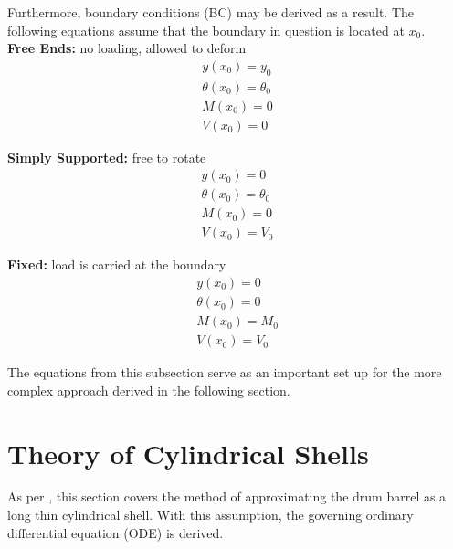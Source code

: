 Furthermore, boundary conditions (BC) may be derived as a result. The following equations assume that the boundary in question is located at $x_0$.\\

\textbf{Free Ends:} no loading, allowed to deform\\
\begin{equation}
	\label{eq:2_freeBC}
	\begin{aligned}
		y(x_0) = y_0          \\
		\theta(x_0)= \theta_0 \\
		M(x_0) = 0            \\
		V(x_0) = 0            
	\end{aligned}
\end{equation}

\textbf{Simply Supported:} free to rotate\\
\begin{equation}
	\label{eq:2_endBC}
	\begin{aligned}
		y(x_0)= 0            \\
		\theta(x_0)=\theta_0 \\
		M(x_0)= 0            \\
		V(x_0) =V_0          
	\end{aligned}
\end{equation}

\textbf{Fixed:} load is carried at the boundary\\
\begin{equation}
	\label{eq:2_fixedBC}
	\begin{aligned}
		y(x_0)=0      \\
		\theta(x_0)=0 \\
		M(x_0)=M_0    \\
		V(x_0) =V_0   
	\end{aligned}
\end{equation}

The equations from this subsection serve as an important set up for the more complex approach derived in the following section. 

\section{Theory of Cylindrical Shells}
\label{section:3_shells}

As per \cite{timoshenko1959theory}, this section covers the method of approximating the drum barrel as a long thin cylindrical shell. With this assumption, the governing ordinary differential equation (ODE) is derived.\\

